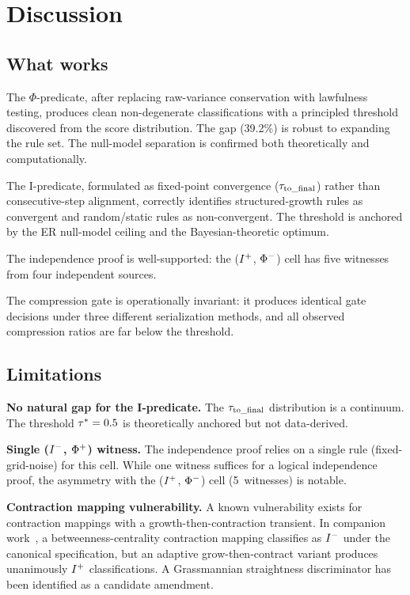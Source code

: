 \documentclass{../shared/primo}
\begin{document}
\section{Discussion}
\label{sec:discussion}

\subsection{What works}

The $\Phi$-predicate, after replacing raw-variance conservation with lawfulness testing, produces clean non-degenerate classifications with a principled threshold discovered from the score distribution. The gap (39.2\%) is robust to expanding the rule set. The null-model separation is confirmed both theoretically and computationally.

The I-predicate, formulated as fixed-point convergence ($\tau_{\mathrm{to\_final}}$) rather than consecutive-step alignment, correctly identifies structured-growth rules as convergent and random/static rules as non-convergent. The threshold is anchored by the ER null-model ceiling and the Bayesian-theoretic optimum.

The independence proof is well-supported: the ($I\textsuperscript{+}$, $\Phi\textsuperscript{$-$}$) cell has five witnesses from four independent sources.

The compression gate is operationally invariant: it produces identical gate decisions under three different serialization methods, and all observed compression ratios are far below the threshold.

\subsection{Limitations}

\textbf{No natural gap for the I-predicate.} The $\tau_{\mathrm{to\_final}}$ distribution is a continuum. The threshold $\tau^* = 0.5$ is theoretically anchored but not data-derived.

\textbf{Single ($I\textsuperscript{$-$}$, $\Phi\textsuperscript{+}$) witness.} The independence proof relies on a single rule (fixed-grid-noise) for this cell. While one witness suffices for a logical independence proof, the asymmetry with the ($I\textsuperscript{+}$, $\Phi\textsuperscript{$-$}$) cell (5~witnesses) is notable.

\textbf{Contraction mapping vulnerability.} A known vulnerability exists for contraction mappings with a growth-then-contraction transient. In companion work~\cite{kowalczyk2026bayesian}, a betweenness-centrality contraction mapping classifies as $I\textsuperscript{$-$}$ under the canonical specification, but an adaptive grow-then-contract variant produces unanimously $I\textsuperscript{+}$ classifications. A Grassmannian straightness discriminator has been identified as a candidate amendment.
\end{document}
